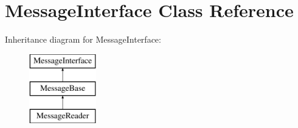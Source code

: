 \hypertarget{class_message_interface}{}\section{Message\+Interface Class Reference}
\label{class_message_interface}
Inheritance diagram for Message\+Interface\+:\begin{figure}[H]
\begin{center}
\leavevmode
\includegraphics[height=3.000000cm]{class_message_interface}
\end{center}
\end{figure}
